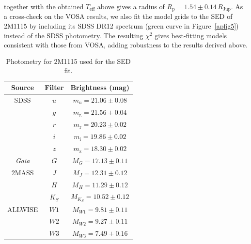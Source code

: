 \documentclass{aa}
\newcommand{\rj}{\ensuremath{R_\mathrm{Jup}}\xspace}
\newcommand{\Rp}{\ensuremath{R_{\mathrm{p}}}\xspace}
\newcommand{\Teff}{\ensuremath{T_{\mathrm{eff}}}\xspace}
\begin{document}
\begin{appendix}
together with the obtained \Teff above gives a radius of $\Rp=1.54\pm0.14\,\rj$. As a cross-check on the VOSA results, we also fit the model grids to the SED of 2M1115 by including its SDSS DR12 spectrum (green curve in Figure~\ref{apfig5}) instead of the SDSS photometry. The resulting $\chi^2$ gives best-fitting models consistent with those from VOSA, adding robustness to the results derived above. 


\begin{table}%
\centering
\caption{Photometry for 2M1115 used for the SED fit.}
\begin{tabular}{c c c}
\hline\hline
Source & Filter & Brightness (mag) \\
\hline 
   SDSS & $u$ & $m_\mathrm{u}=21.06\pm0.08$ \\
        & $g$ & $m_\mathrm{g}=21.56\pm0.04$ \\
        & $r$ & $m_\mathrm{r}=20.23\pm0.02$ \\
        & $i$ & $m_\mathrm{i}=19.86\pm0.02$ \\
        & $z$ & $m_\mathrm{z}=18.30\pm0.02$ \\
   \textit{Gaia} & $G$ & $M_G=17.13\pm0.11$ \\
   2MASS & $J$ & $M_J=12.31\pm0.12$ \\
        & $H$ & $M_H=11.29\pm0.12$ \\
        & $K_S$ & $M_{K_S}=10.52\pm0.12$ \\
   ALLWISE & $W1$ & $M_{W1}=9.81\pm0.11$ \\
        & $W2$ & $M_{W2}=9.27\pm0.11$ \\
        & $W3$ & $M_{W3}=7.49\pm0.16$ \\
\hline                                   %
\end{tabular}
\label{aptab5} 
\end{table}


\end{appendix}
\end{document}
